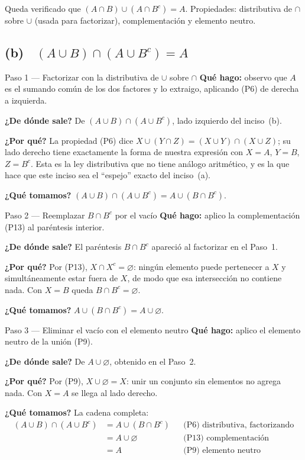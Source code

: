 \documentclass[11pt]{article}
\begin{document}
\begin{resp}
Queda verificado que $(A\cap B)\cup(A\cap B^{c})=A$. Propiedades: distributiva de $\cap$ sobre
$\cup$ (usada para factorizar), complementación y elemento neutro.
\end{resp}

\subsection*{(b) \ $(A\cup B)\cap(A\cup B^{c})=A$}

\begin{paso}{Paso 1 --- Factorizar con la distributiva de $\cup$ sobre $\cap$}
\textbf{Qué hago:} observo que $A$ es el sumando común de los dos factores y lo extraigo,
aplicando (P6) de derecha a izquierda.

\textbf{¿De dónde sale?} De $(A\cup B)\cap(A\cup B^{c})$, lado izquierdo del inciso~(b).

\textbf{¿Por qué?} La propiedad (P6) dice $X\cup(Y\cap Z)=(X\cup Y)\cap(X\cup Z)$; su lado
derecho tiene exactamente la forma de nuestra expresión con $X=A$, $Y=B$, $Z=B^{c}$. Esta es la
ley distributiva que no tiene análogo aritmético, y es la que hace que este inciso sea el
``espejo'' exacto del inciso~(a).

\textbf{¿Qué tomamos?} $(A\cup B)\cap(A\cup B^{c})=A\cup(B\cap B^{c})$.
\end{paso}

\begin{paso}{Paso 2 --- Reemplazar $B\cap B^{c}$ por el vacío}
\textbf{Qué hago:} aplico la complementación (P13) al paréntesis interior.

\textbf{¿De dónde sale?} El paréntesis $B\cap B^{c}$ apareció al factorizar en el Paso~1.

\textbf{¿Por qué?} Por (P13), $X\cap X^{c}=\varnothing$: ningún elemento puede pertenecer a $X$
y simultáneamente estar fuera de $X$, de modo que esa intersección no contiene nada. Con $X=B$
queda $B\cap B^{c}=\varnothing$.

\textbf{¿Qué tomamos?} $A\cup(B\cap B^{c})=A\cup\varnothing$.
\end{paso}

\begin{paso}{Paso 3 --- Eliminar el vacío con el elemento neutro}
\textbf{Qué hago:} aplico el elemento neutro de la unión (P9).

\textbf{¿De dónde sale?} De $A\cup\varnothing$, obtenido en el Paso~2.

\textbf{¿Por qué?} Por (P9), $X\cup\varnothing=X$: unir un conjunto sin elementos no agrega
nada. Con $X=A$ se llega al lado derecho.

\textbf{¿Qué tomamos?} La cadena completa:
\begin{align*}
(A\cup B)\cap(A\cup B^{c})
&=A\cup(B\cap B^{c}) && \text{(P6) distributiva, factorizando}\\
&=A\cup\varnothing && \text{(P13) complementación}\\
&=A && \text{(P9) elemento neutro}
\end{align*}
\end{paso}
\end{document}
